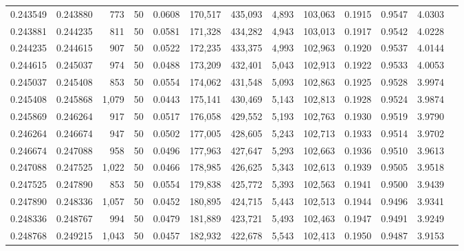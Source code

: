 \begin{tabular}{rrrrrrrrrrrrr}
0.243549 & 0.243880 &   773 &  50 &                                     0.0608 & 170,517 & 435,093 &   4,893 & 103,063 & 0.1915 & 0.9547 & 4.0303 \\
0.243881 & 0.244235 &   811 &  50 &                                     0.0581 & 171,328 & 434,282 &   4,943 & 103,013 & 0.1917 & 0.9542 & 4.0228 \\
0.244235 & 0.244615 &   907 &  50 &                                     0.0522 & 172,235 & 433,375 &   4,993 & 102,963 & 0.1920 & 0.9537 & 4.0144 \\
0.244615 & 0.245037 &   974 &  50 &                                     0.0488 & 173,209 & 432,401 &   5,043 & 102,913 & 0.1922 & 0.9533 & 4.0053 \\
0.245037 & 0.245408 &   853 &  50 &                                     0.0554 & 174,062 & 431,548 &   5,093 & 102,863 & 0.1925 & 0.9528 & 3.9974 \\
0.245408 & 0.245868 & 1,079 &  50 &                                     0.0443 & 175,141 & 430,469 &   5,143 & 102,813 & 0.1928 & 0.9524 & 3.9874 \\
0.245869 & 0.246264 &   917 &  50 &                                     0.0517 & 176,058 & 429,552 &   5,193 & 102,763 & 0.1930 & 0.9519 & 3.9790 \\
0.246264 & 0.246674 &   947 &  50 &                                     0.0502 & 177,005 & 428,605 &   5,243 & 102,713 & 0.1933 & 0.9514 & 3.9702 \\
0.246674 & 0.247088 &   958 &  50 &                                     0.0496 & 177,963 & 427,647 &   5,293 & 102,663 & 0.1936 & 0.9510 & 3.9613 \\
0.247088 & 0.247525 & 1,022 &  50 &                                     0.0466 & 178,985 & 426,625 &   5,343 & 102,613 & 0.1939 & 0.9505 & 3.9518 \\
0.247525 & 0.247890 &   853 &  50 &                                     0.0554 & 179,838 & 425,772 &   5,393 & 102,563 & 0.1941 & 0.9500 & 3.9439 \\
0.247890 & 0.248336 & 1,057 &  50 &                                     0.0452 & 180,895 & 424,715 &   5,443 & 102,513 & 0.1944 & 0.9496 & 3.9341 \\
0.248336 & 0.248767 &   994 &  50 &                                     0.0479 & 181,889 & 423,721 &   5,493 & 102,463 & 0.1947 & 0.9491 & 3.9249 \\
0.248768 & 0.249215 & 1,043 &  50 &                                     0.0457 & 182,932 & 422,678 &   5,543 & 102,413 & 0.1950 & 0.9487 & 3.9153 \\

\end{tabular}
